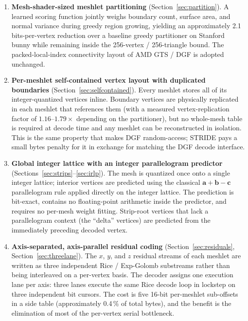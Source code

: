 \documentclass[pdflatex,sn-vancouver-num]{sn-jnl}%
\theoremstyle{thmstyleone}%
\theoremstyle{thmstyletwo}%
\theoremstyle{thmstylethree}%
\begin{document}
\begin{enumerate}
\item \textbf{Mesh-shader-sized meshlet partitioning} (Section~\ref{sec:partition}). A learned scoring function jointly weighs boundary count, surface area, and normal variance during greedy region growing, yielding an approximately 2.1 bits-per-vertex reduction over a baseline greedy partitioner on Stanford bunny while remaining inside the 256-vertex / 256-triangle bound. The packed-local-index connectivity layout of AMD GTS / DGF is adopted unchanged.
\item \textbf{Per-meshlet self-contained vertex layout with duplicated boundaries} (Section~\ref{sec:selfcontained}). Every meshlet stores all of its integer-quantized vertices inline. Boundary vertices are physically replicated in each meshlet that references them (with a measured vertex-replication factor of $1.16$--$1.79\times$ depending on the partitioner), but no whole-mesh table is required at decode time and any meshlet can be reconstructed in isolation. This is the same property that makes DGF random-access; STRIDE pays a small bytes penalty for it in exchange for matching the DGF decode interface.
\item \textbf{Global integer lattice with an integer parallelogram predictor} (Sections~\ref{sec:strips}--\ref{sec:irlp}). The mesh is quantized once onto a single integer lattice; interior vertices are predicted using the classical $\mathbf{a} + \mathbf{b} - \mathbf{c}$ parallelogram rule applied directly on the integer lattice. The prediction is bit-exact, contains no floating-point arithmetic inside the predictor, and requires no per-mesh weight fitting. Strip-root vertices that lack a parallelogram context (the ``delta'' vertices) are predicted from the immediately preceding decoded vertex.
\item \textbf{Axis-separated, axis-parallel residual coding} (Section~\ref{sec:residuals}, Section~\ref{sec:threelane}). The $x$, $y$, and $z$ residual streams of each meshlet are written as three independent Rice / Exp-Golomb substreams rather than being interleaved on a per-vertex basis. The decoder assigns one execution lane per axis: three lanes execute the same Rice decode loop in lockstep on three independent bit cursors. The cost is five 16-bit per-meshlet sub-offsets in a side table (approximately 0.4\,\% of total bytes), and the benefit is the elimination of most of the per-vertex serial bottleneck.
\end{enumerate}
\end{document}
